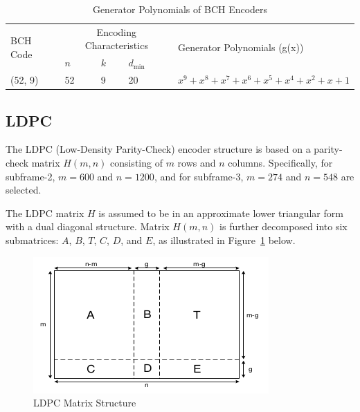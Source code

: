 \begin{table}[h]
\centering
\caption{Generator Polynomials of BCH Encoders}
\label{table:generator_polynomials}
\begin{tabular}{|l|lll|l|}
\hline
\multirow{2}{*}{BCH Code} & \multicolumn{3}{c|}{Encoding Characteristics} & \multirow{2}{*}{Generator Polynomials (g(x))} \\
\cline{2-4}
& $n$ & $k$ & $d_{\text{min}}$ & \\
\hline
(52, 9) & 52 & 9 & 20 & $x^9 + x^8 + x^7 + x^6 + x^5 + x^4 + x^2 + x + 1$ \\
\hline
\end{tabular}
\end{table}

\subsection{LDPC}


\noindent The LDPC (Low-Density Parity-Check) encoder structure is based on a parity-check matrix $H(m, n)$ consisting of $m$ rows and $n$ columns. Specifically, for subframe-2, $m = 600$ and $n = 1200$, and for subframe-3, $m = 274$ and $n = 548$ are selected.

\noindent The LDPC matrix $H$ is assumed to be in an approximate lower triangular form with a dual diagonal structure. Matrix $H(m, n)$ is further decomposed into six submatrices: $A$, $B$, $T$, $C$, $D$, and $E$, as illustrated in Figure~\ref{fig:ldpc-structure} below.

\begin{figure}[ht]
\centering
\includegraphics[width=1\columnwidth]{figs/ldpc.png}    
\caption{LDPC Matrix Structure}
\label{fig:ldpc-structure}
\end{figure}

